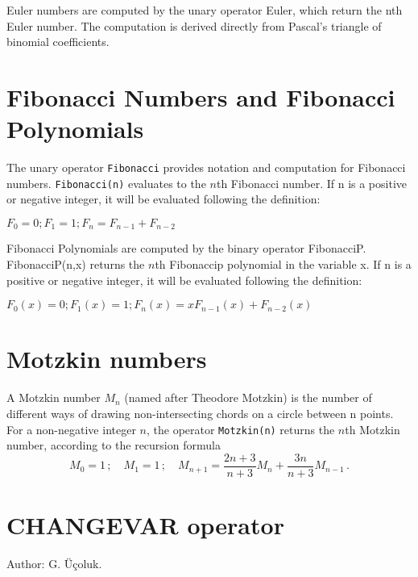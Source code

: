 Euler numbers are computed by the unary operator Euler, which
return the nth Euler number. The computation is derived 
directly from Pascal's triangle of binomial coefficients.

\section{Fibonacci Numbers and Fibonacci Polynomials}
\hypertarget{operator:FIBONACCI}{}\hypertarget{operator:FIBONACCIP}{}

The unary operator \texttt{Fibonacci} provides notation and computation for
Fibonacci numbers.  \texttt{Fibonacci(n)} evaluates to the $n$th Fibonacci
number. If n is a positive or negative integer, it will be evaluated following
the definition:

$F_0 = 0 ; F_1 = 1 ; F_n = F_{n-1} + F_{n-2} $

Fibonacci Polynomials are computed by the binary operator 
FibonacciP. FibonacciP(n,x) returns the $n$th Fibonaccip polynomial
in the variable x. If n is a positive or negative integer, it will be evaluated following
the definition:

$F_0(x) = 0 ; F_1(x) = 1 ; F_n(x) = x F_{n-1}(x) + F_{n-2}(x) $

\section{Motzkin numbers}
\hypertarget{operator:MOTZKIN}{}

A Motzkin number $M_{n}$ (named after Theodore Motzkin) is the number of
different ways of drawing non-intersecting chords on a circle between
n points. For a non-negative integer $n$, the operator \texttt{Motzkin(n)} 
returns the $n$th Motzkin number, according to the recursion formula
\begin{displaymath}
  M_{0} = 1 \,;\quad M_{1}=1\,; \quad
  M_{n+1} = \frac{2n+3}{n+3}M_{n}+ \frac{3n}{n+3}M_{n-1}\,.
\end{displaymath}

\section{CHANGEVAR operator}
\hypertarget{operator:CHANGEVAR}{}

\noindent
Author: G. \"{U}\c{c}oluk.

